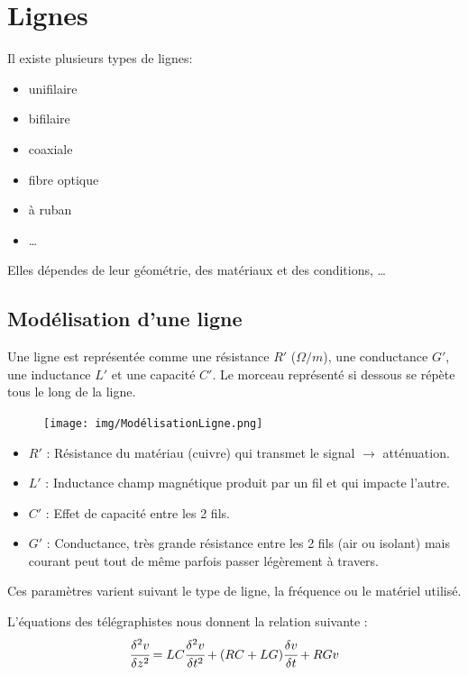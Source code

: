 \section{Lignes}
		
	Il existe plusieurs types de lignes:
	\begin{itemize}
		\item unifilaire
		\item bifilaire
		\item coaxiale
		\item fibre optique
		\item à ruban
		\item \dots
	\end{itemize}
		
		Elles dépendes de leur géométrie, des matériaux et des conditions, \dots
		
	\subsection{Modélisation d'une ligne}
	
		Une ligne est représentée comme  une résistance $R'$ ($\Omega/m$), une conductance $G'$, une inductance $L'$ et une capacité $C'$. Le morceau représenté si dessous se répète tous le long de la ligne.
		
		\begin{figure}[H]
			\centering
			\texttt{[image: img/ModélisationLigne.png]}
		\end{figure}		
		
		\begin{itemize}
			\item \textbf{$R'$} : Résistance du matériau (cuivre) qui transmet le signal $\rightarrow$ atténuation.
			\item \textbf{$L'$} : Inductance champ magnétique produit par un fil et qui impacte l'autre.
			\item \textbf{$C'$} : Effet de capacité entre les 2 fils.
			\item \textbf{$G'$} : Conductance, très grande résistance entre les 2 fils (air ou isolant) mais courant peut tout de même parfois passer légèrement à travers.
		\end{itemize}
		
		Ces paramètres varient suivant le type de ligne, la fréquence ou le matériel utilisé.
		
		L'équations des télégraphistes nous donnent la relation suivante :
		\begin{equation}
			\cfrac{\delta^2v}{\delta z^2} = LC\cfrac{\delta^2 v}{\delta t^2} + (RC + LG)\cfrac{\delta v}{\delta t} + RGv
		\end{equation}
		
